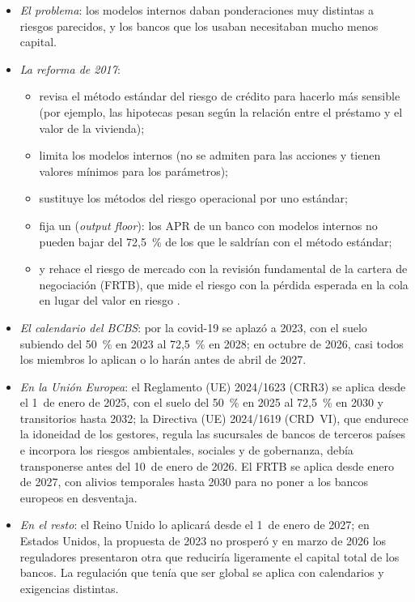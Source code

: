 \documentclass[11pt]{article}
\begin{document}
\begin{itemize}
\item \emph{El problema}: los modelos internos daban ponderaciones muy distintas a riesgos parecidos, y los bancos que los usaban necesitaban mucho menos capital\nocite{BCBS2017Basel3}.
\item \emph{La reforma de 2017}:
  \begin{itemize}
  \item revisa el método estándar del riesgo de crédito para hacerlo más sensible (por ejemplo, las hipotecas pesan según la relación entre el préstamo y el valor de la vivienda);
  \item limita los modelos internos (no se admiten para las acciones y tienen valores mínimos para los parámetros);
  \item sustituye los métodos del riesgo operacional por uno estándar;
  \item fija un  (\emph{output floor}): los APR de un banco con modelos internos no pueden bajar del 72,5~\% de los que le saldrían con el método estándar;
  \item y rehace el riesgo de mercado con la revisión fundamental de la cartera de negociación (FRTB), que mide el riesgo con la pérdida esperada en la cola en lugar del valor en riesgo .
  \end{itemize}
\item \emph{El calendario del BCBS}: por la covid-19 se aplazó a 2023, con el suelo subiendo del 50~\% en 2023 al 72,5~\% en 2028; en octubre de 2026, casi todos los miembros lo aplican o lo harán antes de abril de 2027\nocite{BCBS2020Aplazamiento,BCBS2023Output,BCBS2026Seguimiento}.
\item \emph{En la Unión Europea}: el Reglamento (UE) 2024/1623 (CRR3) se aplica desde el 1~de enero de 2025, con el suelo del 50~\% en 2025 al 72,5~\% en 2030 y transitorios hasta 2032; la Directiva (UE) 2024/1619 (CRD~VI), que endurece la idoneidad de los gestores, regula las sucursales de bancos de terceros países e incorpora los riesgos ambientales, sociales y de gobernanza, debía transponerse antes del 10~de enero de 2026. El FRTB se aplica desde enero de 2027, con alivios temporales hasta 2030 para no poner a los bancos europeos en desventaja\nocite{RegUE2024CRR3,UE2024CRD6,ABE2024BaselMonitoring,CE2026FRTB}.
\item \emph{En el resto}: el Reino Unido lo aplicará desde el 1~de enero de 2027\nocite{PRA2026Basel31}; en Estados Unidos, la propuesta de 2023 no prosperó y en marzo de 2026 los reguladores presentaron otra que reduciría ligeramente el capital total de los bancos\nocite{Fed2026Propuestas}. La regulación que tenía que ser global se aplica con calendarios y exigencias distintas.
\end{itemize}
\end{document}
